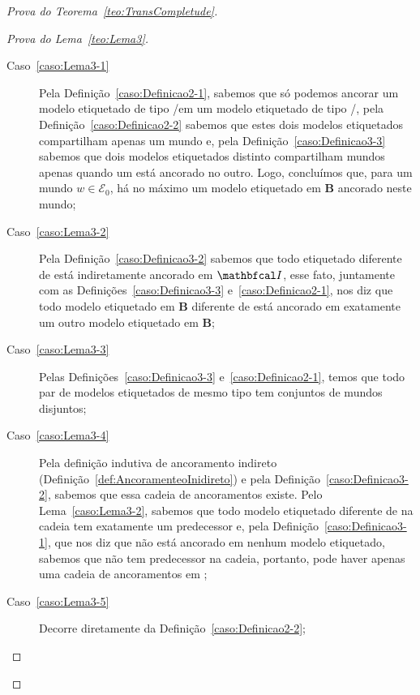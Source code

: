 \begin{apendicesenv}
\begin{proof}[Prova do Teorema~\ref{teo:TransCompletude}]
            \begin{proof}[Prova do Lema~\ref{teo:Lema3}]
                \phantom{a}
                \begin{description}
                    \item[Caso~\ref{caso:Lema3-1}] Pela Definição~\ref{caso:Definicao2-1}, sabemos que só podemos ancorar um modelo etiquetado de tipo \PI/\OPI em
                    um modelo etiquetado de tipo \OPI/\PI, pela Definição~\ref{caso:Definicao2-2} sabemos que estes dois modelos etiquetados compartilham apenas um mundo e,
                    pela Definição~\ref{caso:Definicao3-3} sabemos que dois modelos etiquetados distinto compartilham mundos apenas quando um está ancorado no outro.
                    Logo, concluímos que, para um mundo \(w \in \mathcal{E}_{0}\), há no máximo um modelo etiquetado  em \textbf{B} ancorado neste mundo;

                    \item[Caso~\ref{caso:Lema3-2}] Pela Definição~\ref{caso:Definicao3-2} sabemos que todo \PImodelo etiquetado diferente de \Modeloinicial está indiretamente
                    ancorado em \(\modeloinicial\), esse fato, juntamente com as Definições~\ref{caso:Definicao3-3} e~\ref{caso:Definicao2-1}, nos diz que
                    todo modelo etiquetado em \textbf{B} diferente de \Modeloinicial está ancorado em exatamente um outro modelo etiquetado em \textbf{B};

                    \item[Caso~\ref{caso:Lema3-3}] Pelas Definições~\ref{caso:Definicao3-3} e~\ref{caso:Definicao2-1}, temos que todo par de modelos etiquetados de mesmo tipo
                    tem conjuntos de mundos disjuntos;

                    \item[Caso~\ref{caso:Lema3-4}] Pela definição indutiva de ancoramento indireto (Definição~\ref{def:AncoramenteoInidireto}) e pela
                    Definição~\ref{caso:Definicao3-2}, sabemos que essa cadeia de ancoramentos existe. Pelo Lema~\ref{caso:Lema3-2}, sabemos que todo modelo etiquetado diferente
                    de \Modeloinicial na cadeia tem exatamente um predecessor e, pela Definição~\ref{caso:Definicao3-1}, que nos diz que \Modeloinicial não está ancorado
                    em nenhum modelo etiquetado, sabemos que \Modeloinicial não tem predecessor na cadeia, portanto, pode haver apenas uma cadeia de ancoramentos em ;

                    \item[Caso~\ref{caso:Lema3-5}] Decorre diretamente da Definição~\ref{caso:Definicao2-2};


\end{description}
\end{proof}
\end{proof}
\end{apendicesenv}
